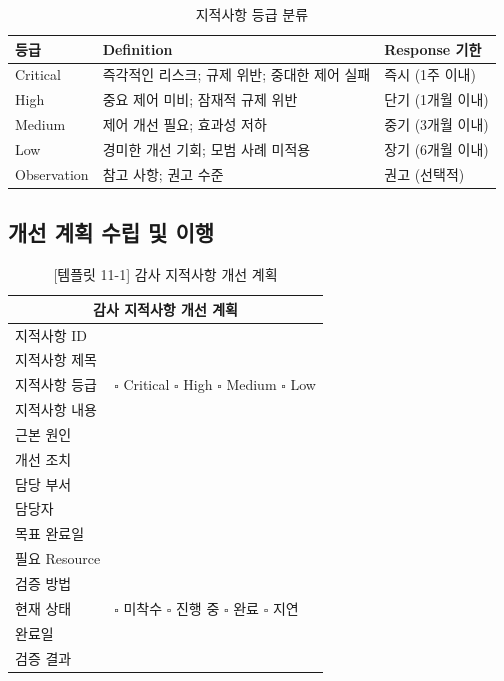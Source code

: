 \begin{table}[htbp]
\centering
\caption{지적사항 등급 분류}
\label{tab:finding_classification}
\begin{tabularx}{\textwidth}{p{2cm}p{3cm}X}
\toprule
\textbf{등급} & \textbf{Definition} & \textbf{Response 기한} \\
\midrule
Critical & 
즉각적인 리스크; 규제 위반; 
중대한 제어 실패 & 
즉시 (1주 이내) \\
\midrule
High & 
중요 제어 미비; 
잠재적 규제 위반 & 
단기 (1개월 이내) \\
\midrule
Medium & 
제어 개선 필요; 
효과성 저하 & 
중기 (3개월 이내) \\
\midrule
Low & 
경미한 개선 기회; 
모범 사례 미적용 & 
장기 (6개월 이내) \\
\midrule
Observation & 
참고 사항; 
권고 수준 & 
권고 (선택적) \\
\bottomrule
\end{tabularx}
\end{table}


\subsection{개선 계획 수립 및 이행}
\label{sec:11.4.2}

\begin{table}[htbp]
\centering
\caption{[템플릿 11-1] 감사 지적사항 개선 계획}
\label{tab:template_remediation_plan}
\begin{tabularx}{\textwidth}{|p{3cm}|X|}
\hline
\multicolumn{2}{|c|}{\textbf{감사 지적사항 개선 계획}} \\
\hline
지적사항 ID & \\
\hline
지적사항 제목 & \\
\hline
지적사항 등급 & $\square$ Critical $\square$ High $\square$ Medium $\square$ Low \\
\hline
지적사항 내용 & \\
\hline
근본 원인 & \\
\hline
개선 조치 & \\
\hline
담당 부서 & \\
\hline
담당자 & \\
\hline
목표 완료일 & \\
\hline
필요 Resource & \\
\hline
검증 방법 & \\
\hline
현재 상태 & $\square$ 미착수 $\square$ 진행 중 $\square$ 완료 $\square$ 지연 \\
\hline
완료일 & \\
\hline
검증 결과 & \\
\hline
\end{tabularx}
\end{table}


